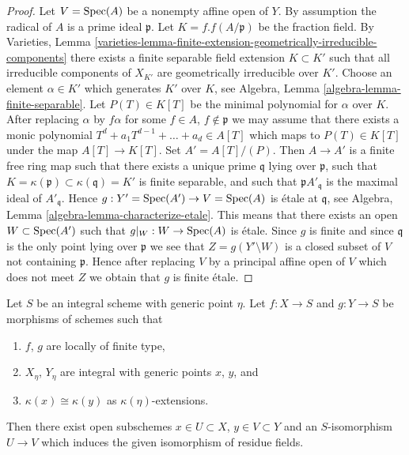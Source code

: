 \begin{proof}
Let $V = \mathop{\rm Spec}(A)$ be a nonempty affine open of $Y$.
By assumption the radical of $A$ is a prime ideal $\mathfrak p$.
Let $K = f.f(A/\mathfrak p)$ be the fraction field. By
Varieties, Lemma
\ref{varieties-lemma-finite-extension-geometrically-irreducible-components}
there exists a finite separable field extension
$K \subset K'$ such that all irreducible components of $X_{K'}$ are
geometrically irreducible over $K'$.
Choose an element $\alpha \in K'$ which generates $K'$ over
$K$, see
Algebra, Lemma \ref{algebra-lemma-finite-separable}.
Let $P(T) \in K[T]$ be the minimal polynomial for $\alpha$ over $K$.
After replacing $\alpha$ by $f \alpha$ for some
$f \in A$, $f \not \in \mathfrak p$
we may assume that there exists a monic polynomial
$T^d + a_1T^{d - 1} + \ldots + a_d \in A[T]$ which maps to
$P(T) \in K[T]$ under the map $A[T] \to K[T]$.
Set $A' = A[T]/(P)$. Then $A \to A'$ is a finite free ring map
such that there exists a unique prime $\mathfrak q$ lying over
$\mathfrak p$, such that
$K = \kappa(\mathfrak p) \subset \kappa(\mathfrak q) = K'$
is finite separable, and such that $\mathfrak pA'_{\mathfrak q}$
is the maximal ideal of $A'_{\mathfrak q}$.
Hence $g : Y' = \mathop{\rm Spec}(A') \to V = \mathop{\rm Spec}(A)$
is \'etale at $\mathfrak q$, see
Algebra, Lemma \ref{algebra-lemma-characterize-etale}.
This means that there exists an open $W \subset \mathop{\rm Spec}(A')$ such
that $g|_W : W \to \mathop{\rm Spec}(A)$ is \'etale.
Since $g$ is finite and since $\mathfrak q$ is the only point lying over
$\mathfrak p$ we see that $Z = g(Y' \setminus W)$ is a closed subset of $V$
not containing $\mathfrak p$. Hence after replacing $V$ by a principal
affine open of $V$ which does not meet $Z$ we obtain that $g$ is finite
\'etale.
\end{proof}

\begin{lemma}
\label{lemma-common-open}
Let $S$ be an integral scheme with generic point $\eta$.
Let $f : X \to S$ and $g : Y \to S$ be morphisms of schemes such that
\begin{enumerate}
\item $f$, $g$ are locally of finite type,
\item $X_\eta$, $Y_\eta$ are integral with generic points $x$, $y$, and
\item $\kappa(x) \cong \kappa(y)$ as $\kappa(\eta)$-extensions.
\end{enumerate}
Then there exist open subschemes $x \in U \subset X$, $y \in V \subset Y$
and an $S$-isomorphism $U \to V$ which induces the given isomorphism of
residue fields.
\end{lemma}


